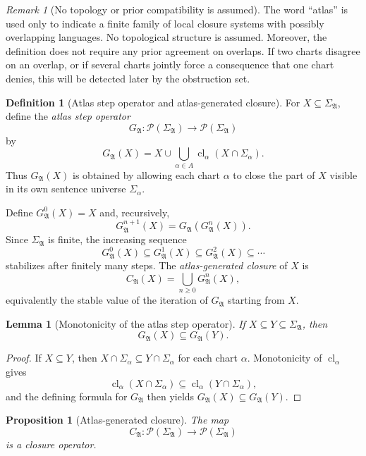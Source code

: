 \documentclass[11pt]{amsart}
\numberwithin{equation}{section}
\theoremstyle{plain}
\newtheorem{lemma}[theorem]{Lemma}
\newtheorem{proposition}[theorem]{Proposition}
\theoremstyle{definition}
\newtheorem{definition}[theorem]{Definition}
\theoremstyle{remark}
\newtheorem{remark}[theorem]{Remark}
\newcommand{\Pow}{\mathcal P}
\newcommand{\Cl}{\operatorname{cl}}
\newcommand{\A}{\mathfrak A}
\newcommand{\Sig}{\Sigma}
\newcommand{\CA}{C_{\mathfrak A}}
\newcommand{\GA}{G_{\mathfrak A}}
\begin{document}
\begin{remark}[No topology or prior compatibility is assumed]
The word ``atlas'' is used only to indicate a finite family of local closure systems with possibly overlapping languages. No topological structure is assumed. Moreover, the definition does not require any prior agreement on overlaps. If two charts disagree on an overlap, or if several charts jointly force a consequence that one chart denies, this will be detected later by the obstruction set.
\end{remark}

\begin{definition}[Atlas step operator and atlas-generated closure]
For \(X\subseteq\Sig_{\A}\), define the \emph{atlas step operator}
\[
  \GA:\Pow(\Sig_{\A})\to\Pow(\Sig_{\A})
\]
by
\[
  \GA(X)=X\cup\bigcup_{\alpha\in A}\Cl_\alpha(X\cap\Sig_\alpha).
\]
Thus \(\GA(X)\) is obtained by allowing each chart \(\alpha\) to close the part of \(X\) visible in its own sentence universe \(\Sig_\alpha\).

Define \(\GA^0(X)=X\) and, recursively,
\[
  \GA^{n+1}(X)=\GA(\GA^n(X)).
\]
Since \(\Sig_{\A}\) is finite, the increasing sequence
\[
  \GA^0(X)\subseteq\GA^1(X)\subseteq\GA^2(X)\subseteq\cdots
\]
stabilizes after finitely many steps. The \emph{atlas-generated closure} of \(X\) is
\[
  \CA(X)=\bigcup_{n\geq0}\GA^n(X),
\]
equivalently the stable value of the iteration of \(\GA\) starting from \(X\).
\end{definition}

\begin{lemma}[Monotonicity of the atlas step operator]
\label{lem:atlas-step-monotonicity}
If \(X\subseteq Y\subseteq\Sig_{\A}\), then
\[
  \GA(X)\subseteq\GA(Y).
\]
\end{lemma}

\begin{proof}
If \(X\subseteq Y\), then \(X\cap\Sig_\alpha\subseteq Y\cap\Sig_\alpha\) for each chart \(\alpha\).  Monotonicity of \(\Cl_\alpha\) gives
\[
  \Cl_\alpha(X\cap\Sig_\alpha)
  \subseteq
  \Cl_\alpha(Y\cap\Sig_\alpha),
\]
and the defining formula for \(\GA\) then yields \(\GA(X)\subseteq\GA(Y)\).
\end{proof}

\begin{proposition}[Atlas-generated closure]
\label{prop:atlas-generated-closure-is-closure}
The map
\[
  \CA:\Pow(\Sig_{\A})\to\Pow(\Sig_{\A})
\]
is a closure operator.
\end{proposition}
\end{document}
